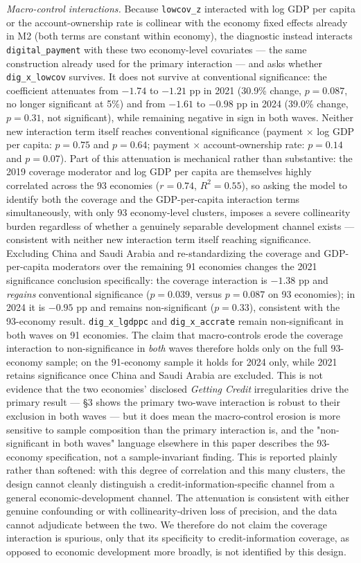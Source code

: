 \emph{Macro-control interactions.} Because \texttt{lowcov\_z} interacted with log GDP per
capita or the account-ownership rate is collinear with the economy fixed effects already in
M2 (both terms are constant within economy), the diagnostic instead interacts
\texttt{digital\_payment} with these two economy-level covariates --- the same construction
already used for the primary interaction --- and asks whether \texttt{dig\_x\_lowcov}
survives. It does not survive at conventional significance: the coefficient attenuates from
$-1.74$ to $-1.21$ pp in 2021 (30.9\% change, $p=0.087$, no longer significant at 5\%) and
from $-1.61$ to $-0.98$ pp in 2024 (39.0\% change, $p=0.31$, not significant), while
remaining negative in sign in both waves. Neither new interaction term itself reaches
conventional significance (payment $\times$ log GDP per capita: $p=0.75$ and $p=0.64$;
payment $\times$ account-ownership rate: $p=0.14$ and $p=0.07$). Part of this attenuation
is mechanical rather than substantive: the 2019 coverage moderator and log GDP per capita
are themselves highly correlated across the 93 economies ($r=0.74$, $R^2=0.55$), so asking
the model to identify both the coverage and the GDP-per-capita interaction terms
simultaneously, with only 93 economy-level clusters, imposes a severe collinearity burden
regardless of whether a genuinely separable development channel exists --- consistent with
neither new interaction term itself reaching significance. Excluding China and Saudi
Arabia and re-standardizing the coverage and GDP-per-capita moderators over the remaining
91 economies changes the 2021 significance conclusion specifically: the coverage
interaction is $-1.38$ pp and \emph{regains} conventional significance ($p=0.039$, versus
$p=0.087$ on 93 economies); in 2024 it is $-0.95$ pp and remains non-significant
($p=0.33$), consistent with the 93-economy result. \texttt{dig\_x\_lgdppc} and
\texttt{dig\_x\_accrate} remain non-significant in both waves on 91 economies. The claim
that macro-controls erode the coverage interaction to non-significance in \emph{both}
waves therefore holds only on the full 93-economy sample; on the 91-economy sample it
holds for 2024 only, while 2021 retains significance once China and Saudi Arabia are
excluded. This is not evidence that the two economies' disclosed \emph{Getting Credit}
irregularities drive the primary result --- \S3 shows the primary two-wave interaction is
robust to their exclusion in both waves --- but it does mean the macro-control erosion is
more sensitive to sample composition than the primary interaction is, and the
"non-significant in both waves" language elsewhere in this paper describes the
93-economy specification, not a sample-invariant finding. This is reported plainly rather
than softened: with this degree of correlation and this many clusters, the design cannot
cleanly distinguish a credit-information-specific channel from a general economic-development
channel. The attenuation is consistent with either genuine confounding or with
collinearity-driven loss of precision, and the data cannot adjudicate between the two. We
therefore do not claim the coverage interaction is spurious, only that its specificity to
credit-information coverage, as opposed to economic development more broadly, is not
identified by this design.

